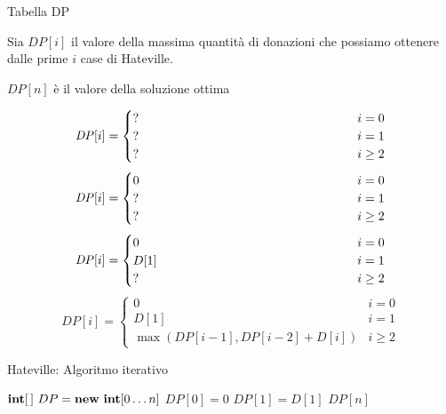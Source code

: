 \begin{frame}{Tabella DP}

\vspace{-9pt}
\begin{myboxtitle}
\BIL
\item Sia $\mathit{DP}[i]$ il \alert{valore} della massima quantità di donazioni che possiamo
ottenere dalle prime $i$ case di Hateville. 
\item $\mathit{DP}[n]$ è il valore della soluzione ottima
\EIL
\end{myboxtitle}

\begin{overprint}
\[
  \mathit{DP}[i] =
  \begin{cases}
   \makebox[6cm][l]{?} & i = 0 \\
   \makebox[6cm][l]{?} & i = 1 \\
   \makebox[6cm][l]{?} & i \geq 2 
   \end{cases}
\]
\[
  \mathit{DP}[i] =
  \begin{cases}
   0 & i = 0 \\
  \makebox[6cm][l]{?} & i = 1 \\
  \makebox[6cm][l]{?} & i \geq 2 
   \end{cases}
\]
\[
  \mathit{DP}[i] =
  \begin{cases}
   0 & i = 0 \\
   D[1] & i = 1 \\
  \makebox[6cm][l]{?} & i \geq 2 
   \end{cases}
\]
\[
  \mathit{DP}[i] =
  \begin{cases}
   0 & i = 0 \\
   D[1] & i = 1 \\
   \max(\mathit{DP}[i-1], \mathit{DP}[i-2] + D[i]) & i \geq 2 
   \end{cases}
\]
\end{overprint}

\end{frame}

\begin{frame}{Hateville: Algoritmo iterativo}

\vspace{-9pt}

\pause
\begin{Procedure}
\caption[A]{\INTEGER\ \textsf{hateville}($\INTEGER[\,]\ D$, \INTEGER $n$)}
$\INTEGER[\,]\ DP = \NEW\ \INTEGER[0 \ldots n]$\;
$\mathit{DP}[0] = 0$\;
$\mathit{DP}[1] = D[1]$\;
\Return $\mathit{DP}[n]$\;
\end{Procedure}

\end{frame}

